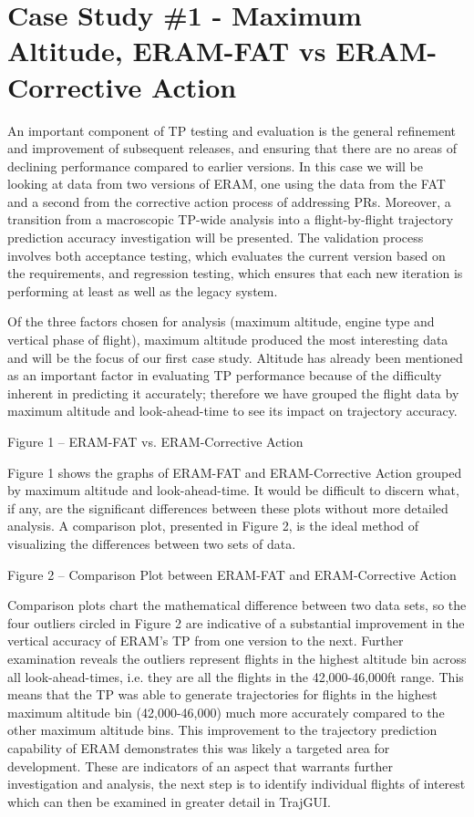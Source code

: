 \documentclass[]{article}
\begin{document}
\section{Case Study \#1 - Maximum Altitude, ERAM-FAT vs ERAM-Corrective Action}
\label{caseStudy1}

An important component of TP testing and evaluation is the general refinement and improvement of subsequent releases, and ensuring that there are no areas of declining performance compared to earlier versions. In this case we will be looking at data from two versions of ERAM, one using the data from the FAT and a second from the corrective action process of addressing PRs. Moreover, a transition from a macroscopic TP-wide analysis into a flight-by-flight trajectory prediction accuracy investigation will be presented. The validation process involves both acceptance testing, which evaluates the current version based on the requirements, and regression testing, which ensures that each new iteration is performing at least as well as the legacy system.

Of the three factors chosen for analysis (maximum altitude, engine type and vertical phase of flight), maximum altitude produced the most interesting data and will be the focus of our first case study. Altitude has already been mentioned as an important factor in evaluating TP performance because of the difficulty inherent in predicting it accurately; therefore we have grouped the flight data by maximum altitude and look-ahead-time to see its impact on trajectory accuracy.


Figure 1 – ERAM-FAT vs. ERAM-Corrective Action

Figure 1 shows the graphs of ERAM-FAT and ERAM-Corrective Action grouped by maximum altitude and look-ahead-time. It would be difficult to discern what, if any, are the significant differences between these plots without more detailed analysis. A comparison plot, presented in Figure 2, is the ideal method of visualizing the differences between two sets of data.
 

Figure 2 – Comparison Plot between ERAM-FAT and ERAM-Corrective Action

Comparison plots chart the mathematical difference between two data sets, so the four outliers circled in Figure 2 are indicative of a substantial improvement in the vertical accuracy of ERAM’s TP from one version to the next. Further examination reveals the outliers represent flights in the highest altitude bin across all look-ahead-times, i.e. they are all the flights in the 42,000-46,000ft range. This means that the TP was able to generate trajectories for flights in the highest maximum altitude bin (42,000-46,000) much more accurately compared to the other maximum altitude bins. This improvement to the trajectory prediction capability of ERAM demonstrates this was likely a targeted area for development. These are indicators of an aspect that warrants further investigation and analysis, the next step is to identify individual flights of interest which can then be examined in greater detail in TrajGUI.
\end{document}
